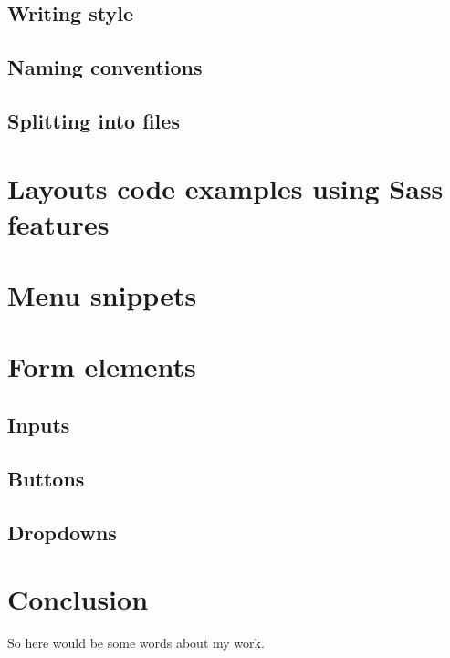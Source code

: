 \documentclass[a4paper,12pt,oneside]{sphinxmanual}
\begin{document}
\section{Writing style}
\label{src/cookbook_tips:writing-style}

\section{Naming conventions}
\label{src/cookbook_tips:naming-conventions}

\section{Splitting into files}
\label{src/cookbook_tips:splitting-into-files}

\chapter{Layouts code examples using Sass features}
\label{src/cookbook_layout:layouts-code-examples-using-sass-features}\label{src/cookbook_layout::doc}

\chapter{Menu snippets}
\label{src/cookbook_menu:menu-snippets}\label{src/cookbook_menu::doc}

\chapter{Form elements}
\label{src/cookbook_form::doc}\label{src/cookbook_form:form-elements}

\section{Inputs}
\label{src/cookbook_form:inputs}

\section{Buttons}
\label{src/cookbook_form:buttons}

\section{Dropdowns}
\label{src/cookbook_form:dropdowns}

\chapter{Conclusion}
\label{src/conclusion::doc}\label{src/conclusion:conclusion}
So here would be some words about my work.
\end{document}
